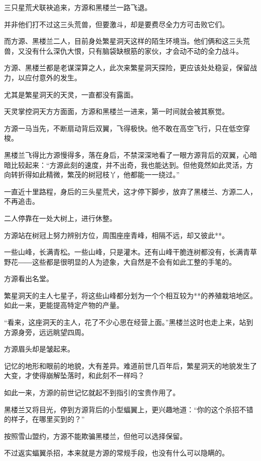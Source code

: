 
\begin{this_body}

三只星荒犬联袂追来，方源和黑楼兰一路飞退。

并非他们打不过这三头荒兽，但要激斗，却是要费尽全力方可击败它们。

而方源、黑楼兰二人，目前身处繁星洞天这样的陌生环境当。他们俩和这三头荒兽，又没有什么深仇大恨，只有脑袋缺根筋的家伙，才会动不动的全力战斗。

方源、黑楼兰都是老谋深算之人，此次来繁星洞天探险，更应该处处稳妥，保留战力，以应付意外的发生。

尤其是繁星洞天的天灵，一直都没有露面。

天灵掌控洞天方方面面，方源和黑楼兰一进来，第一时间就会被其察觉。

方源一马当先，不断扇动背后双翼，飞得极快。他不敢在高空飞行，只在低空穿梭。

黑楼兰飞得比方源慢得多，落在身后，不禁深深地看了一眼方源背后的双翼，心暗暗比较起来：“方源此刻的速度，并不出奇，我也能达到。但他竟然如此灵活，方向转折得如此精微，繁茂的树冠枝丫，他都能一一绕过。”

一直近十里路程，身后的三头星荒犬，这才停下脚步，放弃了黑楼兰、方源二人，不再追击。

二人停靠在一处大树上，进行休整。

方源站在树冠上努力辨别方位，周围座座青峰，相隔不远，却又彼此**。

一些山峰，长满青松。一些山峰，只是灌木。还有山峰干脆连树都没有，长满青草野花――这些都是很明显的人为迹象，大自然是不会有如此工整的手笔的。

方源看出名堂。

繁星洞天的主人七星子，将这些山峰都分划为一个个相互较为**的养殖栽培地区。如此一来，更能提高特定产物的产量。

“看来，这座洞天的主人，花了不少心思在经营上面。”黑楼兰这时也走上来，站到方源身旁，远远眺望四周。

方源眉头却是皱起来。

记忆的地形和眼前的地貌，大有差异。难道前世几百年后，繁星洞天的地貌发生了大变，才使得崩解坠落时，和此刻不一样吗？

如此一来，方源的前世记忆就起不到指引的宝贵作用了。

黑楼兰又将目光，停到方源背后的小型蝠翼上，更兴趣地道：“你的这个杀招不错的样子，在哪里买到的？”

按照雪山盟约，方源不能欺骗黑楼兰，但他可以选择保留。

不过返实蝠翼杀招，本来就是方源的常规手段，也没有什么可以隐瞒的。


\end{this_body}
